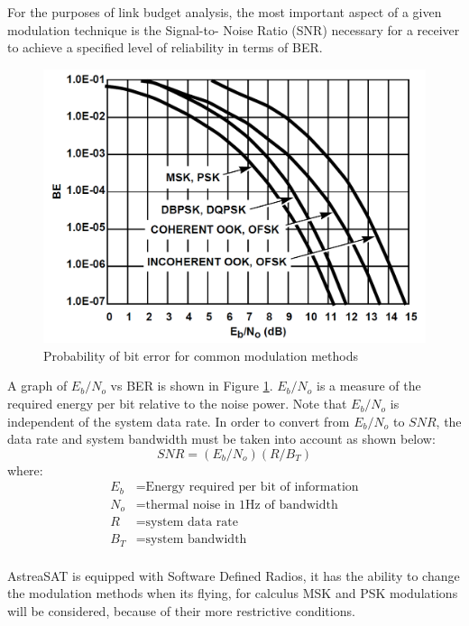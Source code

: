 For the purposes of link budget analysis, the most important
aspect of a given modulation technique is the Signal-to-
Noise Ratio (SNR) necessary for a receiver to achieve a
specified level of reliability in terms of BER.\\

\begin{figure}[h]
	\includegraphics[scale=0.3]{./sections/SatelliteDept/sections/images/BEvsSNR}
	\centering
	\caption{Probability of bit error for common modulation methods \cite{Note1998}}
	\label{BEvsSNR}
\end{figure}
\pagebreak
A graph of $E_b/N_o$
vs BER is shown in Figure \ref{BEvsSNR}. $E_b/N_o$ is a measure of the
required energy per bit relative to the noise power. Note that
$E_b/N_o$ is independent of the system data rate. In order to
convert from $E_b/N_o$ to $SNR$, the data rate and system
bandwidth must be taken into account as shown below:
\begin{equation}
SNR=(E_b/N_o)(R/B_T)
\label{SNReq}
\end{equation}
where:
\begin{align*}
	E_b&= \text{Energy required per bit of information}\\
	N_o&= \text{thermal noise in 1Hz of bandwidth}\\
	R&= \text{system data rate}\\
	B_T&= \text{system bandwidth}
\end{align*}

\paragraph{} AstreaSAT is equipped with Software Defined Radios, it has the ability to change the modulation methods when its flying, for calculus MSK and PSK modulations will be considered, because of their more restrictive conditions.

